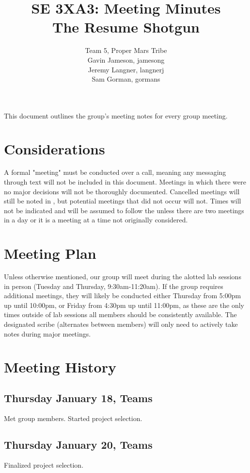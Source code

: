 \documentclass{article}
\title{SE 3XA3: Meeting Minutes\\The Resume Shotgun}
\author{Team 5, Proper Mars Tribe
		\\ Gavin Jameson, jamesong
		\\ Jeremy Langner, langnerj
		\\ Sam Gorman, gormans
}
\date{}
\begin{document}
\maketitle

\newpage

\tableofcontents

\newpage

This document outlines the group's meeting notes for every group meeting. 

\section{Considerations} \label{sec:considerations}
A formal "meeting" must be conducted over a call, meaning any messaging through text will not be included in this document. Meetings in which there were no major decisions will not be thoroughly documented. Cancelled meetings will still be noted in , but potential meetings that did not occur will not. Times will not be indicated and will be assumed to follow the  unless there are two meetings in a day or it is a meeting at a time not originally considered.

\section{Meeting Plan} \label{sec:plam}
Unless otherwise mentioned, our group will meet during the alotted lab sessions in person (Tuesday and Thursday, 9:30am-11:20am). If the group requires additional meetings, they will likely be conducted either Thursday from 5:00pm up until 10:00pm, or Friday from 4:30pm up until 11:00pm, as these are the only times outside of lab sessions all members should be consistently available. The designated scribe (alternates between members) will only need to actively take notes during major meetings.

\section{Meeting History} \label{sec:history}

\subsection{Thursday January 18, Teams}
Met group members. Started project selection.

\subsection{Thursday January 20, Teams}
Finalized project selection.
\end{document}
